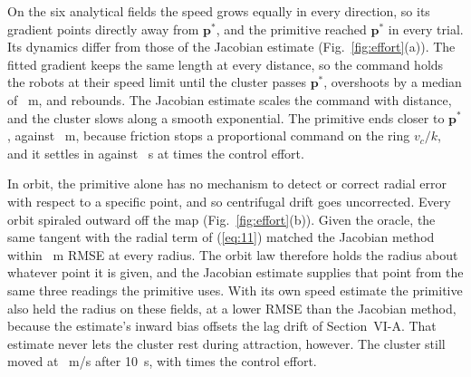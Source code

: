 On the six analytical fields the speed grows equally in every direction, so its gradient points directly away from $\mathbf{p}^*$, and the primitive reached $\mathbf{p}^*$ in every trial. Its dynamics differ from those of the Jacobian estimate (Fig.~\ref{fig:effort}(a)). The fitted gradient keeps the same length at every distance, so the command holds the robots at their speed limit until the cluster passes $\mathbf{p}^*$, overshoots by a median of ~m, and rebounds. The Jacobian estimate scales the command with distance, and the cluster slows along a smooth exponential. The primitive ends closer to $\mathbf{p}^*$,  against ~m, because friction stops a proportional command on the ring $v_c/k$, and it settles in  against ~s at  times the control effort. %

In orbit, the primitive alone has no mechanism to detect or correct radial error with respect to a specific point, and so centrifugal drift goes uncorrected. Every orbit spiraled outward off the map (Fig.~\ref{fig:effort}(b)). Given the oracle, the same tangent with the radial term of (\ref{eq:11}) matched the Jacobian method within ~m RMSE at every radius. The orbit law therefore holds the radius about whatever point it is given, and the Jacobian estimate supplies that point from the same three readings the primitive uses. With its own speed estimate the primitive also held the radius on these fields, at a lower RMSE than the Jacobian method, because the estimate's inward bias offsets the lag drift of Section~VI-A. That estimate never lets the cluster rest during attraction, however. The cluster still moved at ~m/s after 10~s, with  times the control effort. %

